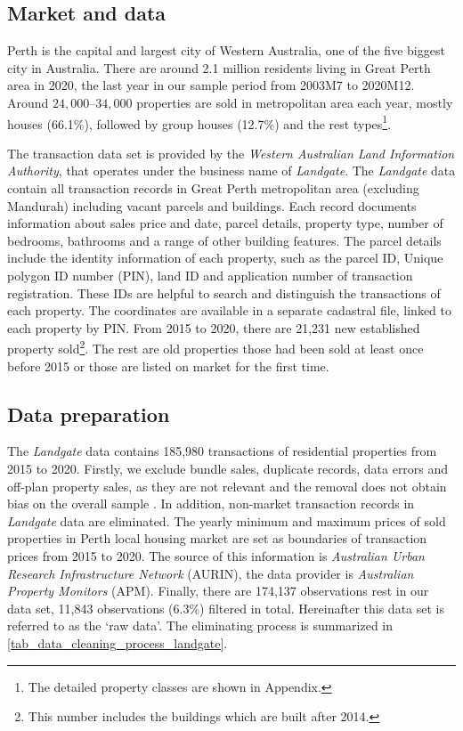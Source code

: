 \subsection{Market and data}

Perth is the capital and largest city of Western Australia, one of the five biggest city in Australia. There are around 2.1 million residents living in Great Perth area in 2020, the last year in our sample period from 2003M7 to 2020M12. Around $24,000$--$34,000$ properties are sold in metropolitan area each year, mostly houses (66.1\%), followed by group houses (12.7\%) and the rest types\footnote{The detailed property classes are shown in Appendix.}.

\noindent The transaction data set is provided by the \textit{Western Australian Land Information Authority}, that operates under the business name of \textit{Landgate}. The \textit{Landgate} data contain all transaction records in Great Perth metropolitan area (excluding Mandurah) including vacant parcels and buildings. Each record documents information about sales price and date, parcel details, property type, number of bedrooms, bathrooms and a range of other building features. The parcel details include the identity information of each property, such as the parcel ID, Unique polygon ID number (PIN), land ID and application number of transaction registration. These IDs are helpful to search and distinguish the transactions of each property. The coordinates are available in a separate cadastral file, linked to each property by PIN. From 2015 to 2020, there are 21,231 new established property sold\footnote{This number includes the buildings which are built after 2014.}. The rest are old properties those had been sold at least once before 2015 or those are listed on market for the first time.

\subsection{Data preparation}

The \textit{Landgate} data contains 185,980 transactions of residential properties from 2015 to 2020. Firstly, we exclude bundle sales, duplicate records, data errors and off-plan property sales, as they are not relevant and the removal does not obtain bias on the overall sample \citep{krause_lipscomb16}. In addition, non-market transaction records in \textit{Landgate} data are eliminated. The yearly minimum and maximum prices of sold properties in Perth local housing market are set as boundaries of transaction prices from 2015 to 2020. The source of this information is \textit{Australian Urban Research Infrastructure Network} (AURIN), the data provider is \textit{Australian Property Monitors} (APM). Finally, there are 174,137 observations rest in our data set, 11,843 observations (6.3\%) filtered in total. Hereinafter this data set is referred to as the `raw data'. The eliminating process is summarized in \autoref{tab_data_cleaning_process_landgate}. 

